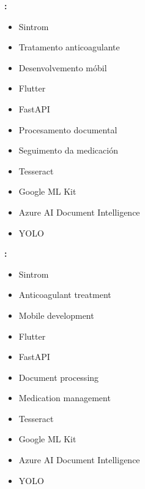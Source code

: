 \noindent
\begin{minipage}[t]{0.47\linewidth}
    \textbf{\palabraschaveprincipal:}

    \begin{itemize}
        \item Sintrom
        \item Tratamento anticoagulante
        \item Desenvolvemento móbil
        \item Flutter
        \item FastAPI
        \item Procesamento documental
        \item Seguimento da medicación
        \item Tesseract
        \item Google ML Kit
        \item Azure AI Document Intelligence
        \item YOLO
    \end{itemize}
\end{minipage}
\hfill
\begin{minipage}[t]{0.47\linewidth}
    \textbf{\palabraschavesecundaria:}

    \begin{itemize}
        \item Sintrom
        \item Anticoagulant treatment
        \item Mobile development
        \item Flutter
        \item FastAPI
        \item Document processing
        \item Medication management
        \item Tesseract
        \item Google ML Kit
        \item Azure AI Document Intelligence
        \item YOLO
    \end{itemize}
\end{minipage}